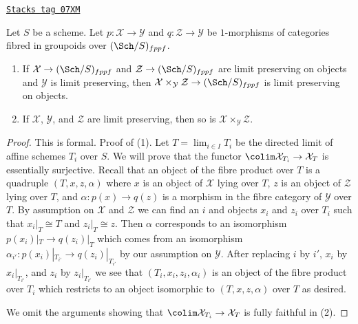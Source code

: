 \begin{lemma}
\label{artin-lemma-fibre-product-limit-preserving}
\href{https://stacks.math.columbia.edu/tag/07XM}{\texttt{Stacks tag 07XM}}

Let $S$ be a scheme. Let $p : \mathcal{X} \to \mathcal{Y}$ and
$q : \mathcal{Z} \to \mathcal{Y}$ be $1$-morphisms of categories
fibred in groupoids over $(\Sch/S)_{fppf}$.
\begin{enumerate}
\item If $\mathcal{X} \to (\Sch/S)_{fppf}$ and
$\mathcal{Z} \to (\Sch/S)_{fppf}$ are limit preserving on objects and
$\mathcal{Y}$ is limit preserving, then
$\mathcal{X} \times_\mathcal{Y} \mathcal{Z} \to (\Sch/S)_{fppf}$ is
limit preserving on objects.
\item If $\mathcal{X}$, $\mathcal{Y}$,
and $\mathcal{Z}$ are limit preserving, then so
is $\mathcal{X} \times_\mathcal{Y} \mathcal{Z}$.
\end{enumerate}
\end{lemma}

\begin{proof}
This is formal. Proof of (1). Let $T = \lim_{i \in I} T_i$ be the directed
limit of affine schemes $T_i$ over $S$. We will prove that the functor
$\colim \mathcal{X}_{T_i} \to \mathcal{X}_T$ is essentially surjective.
Recall that an object of the fibre product over $T$ is a quadruple
$(T, x, z, \alpha)$ where $x$ is an object of $\mathcal{X}$ lying over $T$,
$z$ is an object of $\mathcal{Z}$ lying over $T$, and
$\alpha : p(x) \to q(z)$ is a morphism in the fibre category of
$\mathcal{Y}$ over $T$. By assumption on $\mathcal{X}$ and $\mathcal{Z}$
we can find an $i$ and objects $x_i$ and $z_i$ over $T_i$ such that
$x_i|_T \cong T$ and $z_i|_T \cong z$. Then $\alpha$ corresponds to
an isomorphism $p(x_i)|_T \to q(z_i)|_T$ which comes from an isomorphism
$\alpha_{i'} : p(x_i)|_{T_{i'}} \to q(z_i)|_{T_{i'}}$ by our assumption on
$\mathcal{Y}$. After replacing $i$ by $i'$, $x_i$ by $x_i|_{T_{i'}}$, and
$z_i$ by $z_i|_{T_{i'}}$ we see that $(T_i, x_i, z_i, \alpha_i)$
is an object of the fibre product over $T_i$ which restricts to
an object isomorphic to $(T, x, z, \alpha)$ over $T$ as desired.

\medskip\noindent
We omit the arguments showing that $\colim \mathcal{X}_{T_i} \to \mathcal{X}_T$
is fully faithful in (2).
\end{proof}


